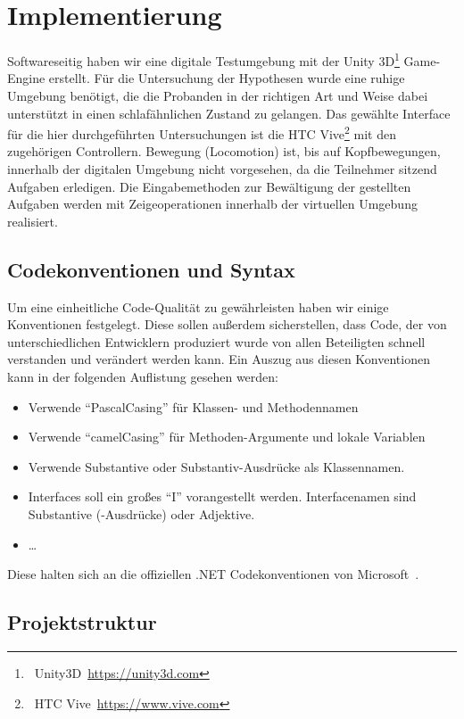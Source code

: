 \section{Implementierung}

Softwareseitig haben wir eine digitale Testumgebung mit der Unity 3D\footnote{~Unity3D~\url{https://unity3d.com}} Game-Engine erstellt. Für die Untersuchung der Hypothesen wurde eine ruhige Umgebung benötigt, die die Probanden in der richtigen Art und Weise dabei unterstützt in einen schlafähnlichen Zustand zu gelangen. 
Das gewählte Interface für die hier durchgeführten Untersuchungen ist die HTC Vive\footnote{~HTC Vive~\url{https://www.vive.com}} mit den zugehörigen Controllern. 
Bewegung (Locomotion) ist, bis auf Kopfbewegungen, innerhalb der digitalen Umgebung nicht vorgesehen, da die Teilnehmer sitzend Aufgaben erledigen. 
Die Eingabemethoden zur Bewältigung der gestellten Aufgaben werden mit Zeigeoperationen innerhalb der virtuellen Umgebung realisiert. 

\subsection{Codekonventionen und Syntax}

Um eine einheitliche Code-Qualität zu gewährleisten haben wir einige Konventionen festgelegt. Diese sollen außerdem sicherstellen, dass Code, der von unterschiedlichen Entwicklern produziert wurde von allen Beteiligten schnell verstanden und verändert werden kann.
Ein Auszug aus diesen Konventionen kann in der folgenden Auflistung gesehen werden: 
\begin{itemize}
    \item Verwende "`PascalCasing"' für Klassen- und Methodennamen
    \item Verwende "`camelCasing"' für Methoden-Argumente und lokale Variablen
    \item Verwende Substantive oder Substantiv-Ausdrücke als Klassennamen.
    \item Interfaces soll ein großes "`I"' vorangestellt werden. Interfacenamen sind Substantive (-Ausdrücke) oder Adjektive.
    \item \ldots
\end{itemize}

Diese halten sich an die offiziellen .NET Codekonventionen von Microsoft~\cite{online:condeConventions}.

\subsection{Projektstruktur}


